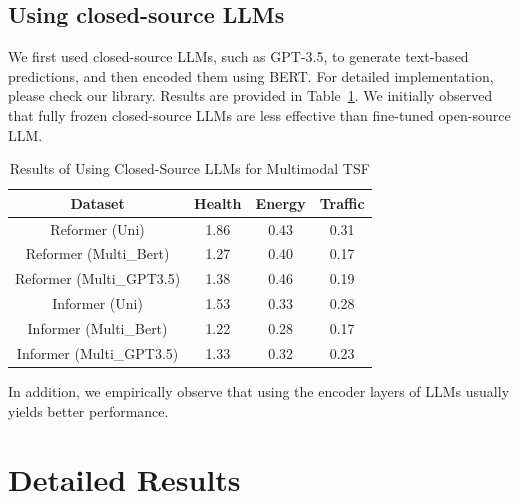 \subsection{Using closed-source LLMs}
We first used closed-source LLMs, such as GPT-3.5, to generate text-based predictions, and then encoded them using BERT. For detailed implementation, please check our library. Results are provided in Table~\ref{tab:GPT}. We initially observed that fully frozen closed-source LLMs are less effective than fine-tuned open-source LLM.
\begin{table}[h]
\centering

\begin{tabular}{cccc}
\hline
Dataset                & Health & Energy & Traffic \\ \hline
Reformer (Uni)          & 1.86   & 0.43   & 0.31    \\
Reformer (Multi\_Bert)   & 1.27   & 0.40   & 0.17    \\
Reformer (Multi\_GPT3.5) & 1.38   & 0.46   & 0.19    \\
Informer (Uni)          & 1.53   & 0.33   & 0.28    \\
Informer (Multi\_Bert)   & 1.22   & 0.28   & 0.17    \\
Informer (Multi\_GPT3.5) & 1.33   & 0.32   & 0.23    \\ \hline
\end{tabular}
\caption{Results of Using Closed-Source LLMs for Multimodal TSF\label{tab:GPT}}

\end{table}

In addition, we empirically observe that using the encoder layers of LLMs usually yields better performance.
\newpage
\section{Detailed Results}\label{app:detailed_results}

